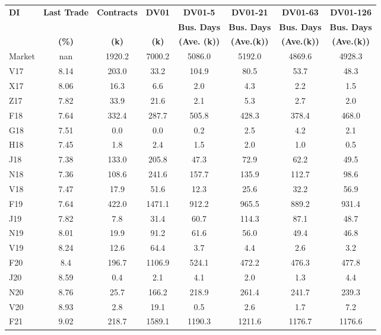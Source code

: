 \documentclass[article,crop=false]{standalone}%
\begin{document}
%
\normalsize%
\setlength{\tabcolsep}{0.15cm}%
\begin{tabular}[h]{l c c c c c c c}%
\hline%
\rowcolor{white}%
\textbf{DI}&\textbf{Last Trade}&\textbf{Contracts}&\textbf{DV01}&\textbf{DV01{-}5}&\textbf{DV01{-}21}&\textbf{DV01{-}63}&\textbf{DV01{-}126}\\%
\rowcolor{white}%
\textbf{}&\textbf{}&\textbf{}&\textbf{}&\textbf{Bus. Days}&\textbf{Bus. Days}&\textbf{Bus. Days}&\textbf{Bus. Days}\\%
\rowcolor{white}%
\textbf{}&\textbf{(\%)}&\textbf{(k)}&\textbf{(k)}&\textbf{(Ave. (k))}&\textbf{(Ave.(k))}&\textbf{(Ave.(k))}&\textbf{(Ave.(k))}\\%
\hline%
\rowcolor{gray}%
Market&nan&1920.2&7000.2&5086.0&5192.0&4869.6&4928.3\\%
\rowcolor{white}%
V17&8.14&203.0&33.2&104.9&80.5&53.7&48.3\\%
\rowcolor{lightgray}%
X17&8.06&16.3&6.6&2.0&4.3&2.2&1.5\\%
\rowcolor{white}%
Z17&7.82&33.9&21.6&2.1&5.3&2.7&2.0\\%
\rowcolor{lightgray}%
F18&7.64&332.4&287.7&505.8&428.3&378.4&468.0\\%
\rowcolor{white}%
G18&7.51&0.0&0.0&0.2&2.5&4.2&2.1\\%
\rowcolor{lightgray}%
H18&7.45&1.8&2.4&1.5&2.0&1.0&0.5\\%
\rowcolor{white}%
J18&7.38&133.0&205.8&47.3&72.9&62.2&49.5\\%
\rowcolor{lightgray}%
N18&7.36&108.6&241.6&157.7&135.9&112.7&98.6\\%
\rowcolor{white}%
V18&7.47&17.9&51.6&12.3&25.6&32.2&56.9\\%
\rowcolor{lightgray}%
F19&7.64&422.0&1471.1&912.2&965.5&889.2&931.4\\%
\rowcolor{white}%
J19&7.82&7.8&31.4&60.7&114.3&87.1&48.7\\%
\rowcolor{lightgray}%
N19&8.01&19.9&91.2&61.6&56.0&49.4&46.8\\%
\rowcolor{white}%
V19&8.24&12.6&64.4&3.7&4.4&2.6&3.2\\%
\rowcolor{lightgray}%
F20&8.4&196.7&1106.9&524.1&472.2&476.3&477.8\\%
\rowcolor{white}%
J20&8.59&0.4&2.1&4.1&2.0&1.3&4.4\\%
\rowcolor{lightgray}%
N20&8.76&25.7&166.2&218.9&261.4&241.7&239.3\\%
\rowcolor{white}%
V20&8.93&2.8&19.1&0.5&2.6&1.7&7.2\\%
\rowcolor{lightgray}%
F21&9.02&218.7&1589.1&1190.3&1211.6&1176.7&1176.6\\%

\end{tabular}
\end{document}
